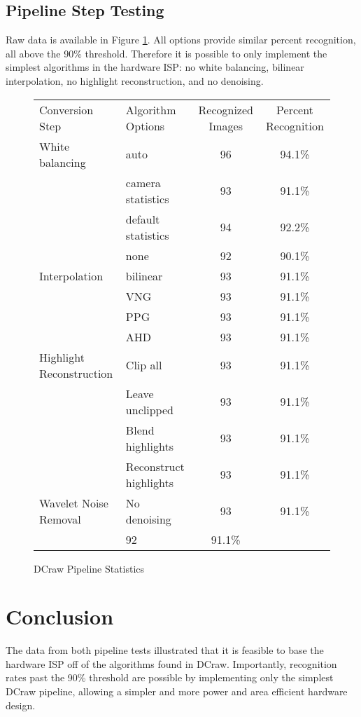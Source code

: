 \documentclass{report}
\begin{document}
	\subsection{Pipeline Step Testing}
	Raw data is available in Figure \ref{datapipeline}. All options provide similar percent recognition, all above the 90\% threshold. Therefore it is possible to only implement the simplest algorithms in the hardware ISP: no white balancing, bilinear interpolation, no highlight reconstruction, and no denoising.
	
	\begin{figure}
		\begin{center}
			\label{datapipeline}
			\caption{DCraw Pipeline Statistics}
			\begin{tabular}{llcc}
				Conversion Step & Algorithm Options & Recognized Images & Percent Recognition \\
				White balancing & auto & 96 & 94.1\%\\
				& camera statistics & 93 & 91.1\%\\
				& default statistics & 94 & 92.2\%\\
				& none & 92 & 90.1\%\\
				Interpolation & bilinear & 93 & 91.1\%\\
				& VNG & 93 & 91.1\%\\
				& PPG & 93 & 91.1\%\\
				& AHD & 93 & 91.1\%\\
				Highlight Reconstruction & Clip all & 93 & 91.1\%\\
				& Leave unclipped & 93 & 91.1\%\\
				& Blend highlights & 93 & 91.1\%\\
				& Reconstruct highlights & 93 & 91.1\%\\
				Wavelet Noise Removal & No denoising & 93 & 91.1\%\\
				& 92 & 91.1\%
			\end{tabular}
		\end{center}
	\end{figure}
	
	\section{Conclusion}
	The data from both pipeline tests illustrated that it is feasible to base the hardware ISP off of the algorithms found in DCraw. Importantly, recognition rates past the 90\% threshold are possible by implementing only the simplest DCraw pipeline, allowing a simpler and more power and area efficient hardware design.
\end{document}

